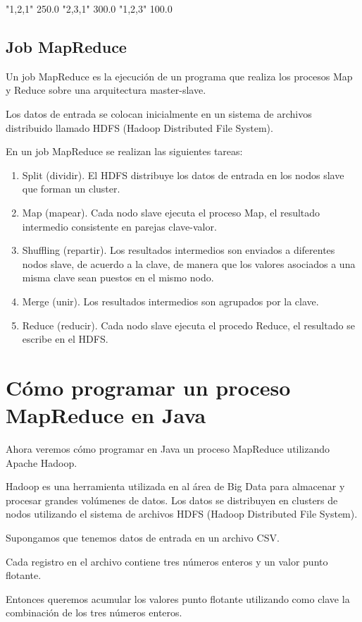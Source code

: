 "1,2,1"  250.0 "2,3,1"  300.0 "1,2,3"  100.0

\subsection{Job MapReduce}

Un job MapReduce es la ejecución de un programa que realiza los procesos Map y Reduce sobre una arquitectura master-slave.

Los datos de entrada se colocan inicialmente en un sistema de archivos distribuido llamado HDFS (Hadoop Distributed File System).

En un job MapReduce se realizan las siguientes tareas:

\begin{enumerate}
\item Split (dividir). El HDFS distribuye los datos de entrada en los nodos slave que forman un cluster.
\item Map (mapear). Cada nodo slave ejecuta el proceso Map, el resultado intermedio consistente en parejas clave-valor.
\item Shuffling (repartir). Los resultados intermedios son enviados a diferentes nodos slave, de acuerdo a la clave, de manera que los valores asociados a una misma clave sean puestos en el mismo nodo.
\item Merge (unir). Los resultados intermedios son agrupados por la clave.
\item Reduce (reducir). Cada nodo slave ejecuta el procedo Reduce, el resultado se escribe en el HDFS.
\end{enumerate}

\section{Cómo programar un proceso MapReduce en Java}

Ahora veremos cómo programar en Java un proceso MapReduce utilizando Apache Hadoop.

Hadoop es una herramienta utilizada en al área de Big Data para almacenar y procesar grandes volúmenes de datos. Los datos se distribuyen en clusters de nodos utilizando el sistema de archivos HDFS (Hadoop Distributed File System).

Supongamos que tenemos datos de entrada en un archivo CSV.

Cada registro en el archivo contiene tres números enteros y un valor punto flotante.

Entonces queremos acumular los valores punto flotante utilizando como clave la combinación de los tres números enteros.

